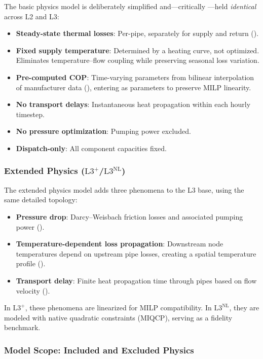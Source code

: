 \documentclass[review,3p]{elsarticle}
\newcommand{\Lplus}{\mathrm{L3}^{+}}
\newcommand{\Lnl}{\mathrm{L3}^{\mathrm{NL}}}
\begin{document}
The basic physics model is deliberately simplified and---critically
---held \emph{identical} across L2 and L3:
\begin{itemize}[nosep]
    \item \textbf{Steady-state thermal losses}: Per-pipe, separately
    for supply and return ().
    \item \textbf{Fixed supply temperature}: Determined by a heating
    curve, not optimized. Eliminates temperature--flow coupling while
    preserving seasonal loss variation.
    \item \textbf{Pre-computed COP}: Time-varying parameters from
    bilinear interpolation of manufacturer data
    (), entering as parameters to preserve MILP
    linearity.
    \item \textbf{No transport delays}: Instantaneous heat
    propagation within each hourly timestep.
    \item \textbf{No pressure optimization}: Pumping power excluded.
    \item \textbf{Dispatch-only}: All component capacities fixed.
\end{itemize}

\subsubsection{Extended Physics ($\Lplus$/$\Lnl$)}

The extended physics model adds three phenomena to the L3 base,
using the same detailed topology:
\begin{itemize}[nosep]
    \item \textbf{Pressure drop}: Darcy--Weisbach friction losses
    and associated pumping power ().
    \item \textbf{Temperature-dependent loss propagation}:
    Downstream node temperatures depend on upstream pipe losses,
    creating a spatial temperature profile
    ().
    \item \textbf{Transport delay}: Finite heat propagation time
    through pipes based on flow velocity
    ().
\end{itemize}

In $\Lplus$, these phenomena are linearized for MILP compatibility.
In $\Lnl$, they are modeled with native quadratic constraints
(MIQCP), serving as a fidelity benchmark.

\subsubsection{Model Scope: Included and Excluded Physics}
\label{sec:model_scope}
\end{document}
